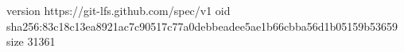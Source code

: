 version https://git-lfs.github.com/spec/v1
oid sha256:83c18c13ea8921ac7c90517c77a0debbeadee5ae1b66cbba56d1b05159b53659
size 31361
